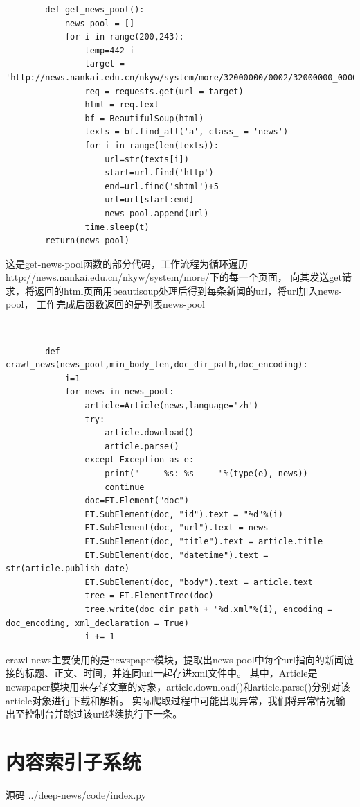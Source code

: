 \documentclass[12pt]{article}
\begin{document}
		
		\begin{lstlisting}
		def get_news_pool():
			news_pool = []
			for i in range(200,243):
				temp=442-i
				target = 'http://news.nankai.edu.cn/nkyw/system/more/32000000/0002/32000000_00000'+str(temp)+'.shtml'
				req = requests.get(url = target)
				html = req.text
				bf = BeautifulSoup(html)
				texts = bf.find_all('a', class_ = 'news')
				for i in range(len(texts)):
					url=str(texts[i])
					start=url.find('http')
					end=url.find('shtml')+5
					url=url[start:end]
					news_pool.append(url)
				time.sleep(t)				
		return(news_pool)
		\end{lstlisting}
		
		这是get-news-pool函数的部分代码，工作流程为循环遍历http://news.nankai.edu.cn/nkyw/system/more/下的每一个页面，
		向其发送get请求，将返回的html页面用beautisoup处理后得到每条新闻的url，将url加入news-pool，
		工作完成后函数返回的是列表news-pool
		
		~\\
		
		\begin{lstlisting}
		def crawl_news(news_pool,min_body_len,doc_dir_path,doc_encoding):
			i=1
			for news in news_pool:
				article=Article(news,language='zh')
				try:
					article.download()
					article.parse()
				except Exception as e:
					print("-----%s: %s-----"%(type(e), news))
					continue
				doc=ET.Element("doc")
				ET.SubElement(doc, "id").text = "%d"%(i)
				ET.SubElement(doc, "url").text = news
				ET.SubElement(doc, "title").text = article.title
				ET.SubElement(doc, "datetime").text = str(article.publish_date)
				ET.SubElement(doc, "body").text = article.text
				tree = ET.ElementTree(doc)
				tree.write(doc_dir_path + "%d.xml"%(i), encoding = doc_encoding, xml_declaration = True)
				i += 1
		\end{lstlisting}
		
		crawl-news主要使用的是newspaper模块，提取出news-pool中每个url指向的新闻链接的标题、正文、时间，并连同url一起存进xml文件中。
		其中，Article是newspaper模块用来存储文章的对象，article.download()和article.parse()分别对该article对象进行下载和解析。
		实际爬取过程中可能出现异常，我们将异常情况输出至控制台并跳过该url继续执行下一条。
		
		\newpage
		
		\section{内容索引子系统}
		
		源码 ../deep-news/code/index.py
		
\end{document}
